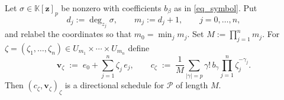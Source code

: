 \documentclass[final]{siamltex}
\newcommand{\K}{\mathbb{K}}
\newcommand{\bz}{\bm{z}}
\newcommand{\bv}{\bm{v}}
\newcommand{\abs}[1]{\left|#1\right|}
\begin{document}
\begin{theorem}\label{thm_grid}
  Let $\sigma \in \K[\bz]_{p}$ be nonzero with coefficients $b_{\beta}$ as in
  \eqref{eq_symbol}.  Put
  \begin{equation}\label{eq_degrees}
    d_{j} := \deg_{z_{j}} \sigma,
    \qquad
    m_{j} := d_{j}+1,
    \qquad j = 0,\ldots,n,
  \end{equation}
  and relabel the coordinates so that $m_{0} = \min_{j} m_{j}$.  Set
  $M := \prod_{j=1}^{n} m_{j}$.  For
  $\zeta = (\zeta_{1},\ldots,\zeta_{n}) \in U_{m_{1}} \times \cdots \times U_{m_{n}}$
  define
  \begin{equation}\label{eq_grid}
    \bv_{\zeta} \;:=\; e_{0} + \sum_{j=1}^{n} \zeta_{j}\,e_{j},
    \qquad
    c_{\zeta} \;:=\; \frac{1}{M}\sum_{\abs{\gamma}=p} \gamma!\,b_{\gamma}
      \prod_{j=1}^{n} \zeta_{j}^{-\gamma_{j}} .
  \end{equation}
  Then $(c_{\zeta},\bv_{\zeta})_{\zeta}$ is a directional schedule for
  $\mathcal{P}$ of length $M$.
\end{theorem}
\end{document}
